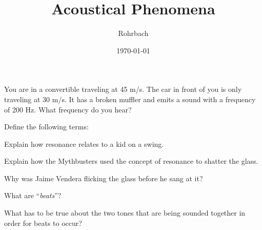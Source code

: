 \documentclass[10pt]{exam}
\title{Acoustical Phenomena}
\author{Rohrbach}
\date{\today}
\begin{document}
\maketitle

\begin{questions}


\question
  You are in a convertible traveling at 45 m/s.  The car in front of you is only traveling at 30 m/s.  It has a broken muffler and emits a sound with a frequency of 200 Hz.  What frequency do you hear? \vs[3]



\question
  Define the following terms:


\question
  Explain how resonance relates to a kid on a swing. \vs[2]

\question
  Explain how the Mythbusters used the concept of resonance to shatter the glass. \vs[2]

\question
  Why was Jaime Vendera flicking the glass before he sang at it? \vs[2]

\pagebreak




\question
  What are ``\emph{beats}''? \vs

\question
  What has to be true about the two tones that are being sounded together in order for beats to occur? \vs



\end{questions}
\end{document}
